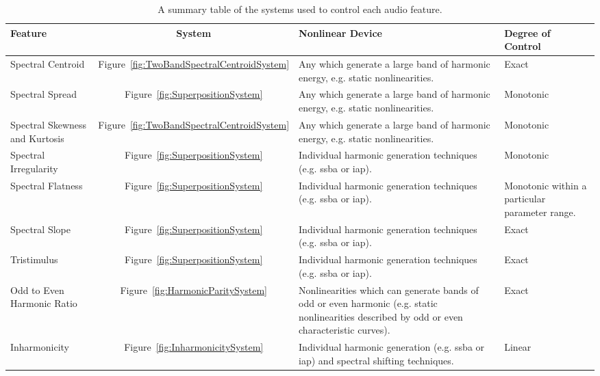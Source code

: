 	\begin{table}[h!]
		\centering
		\begin{tabular}{|C{3cm}|c|C{5cm}|C{3cm}|}
			\hline
			\bf{Feature} & \bf{System} & \bf{Nonlinear Device} & \bf{Degree of Control} \tabularnewline
			\hline
			\hline
			Spectral Centroid & Figure~\ref{fig:TwoBandSpectralCentroidSystem} & 
			Any which generate a large band of harmonic energy, e.g. static nonlinearities. & 
			Exact \tabularnewline
			\hline
			Spectral Spread & Figure~\ref{fig:SuperpositionSystem} & 
			Any which generate a large band of harmonic energy, e.g. static nonlinearities. & 
			Monotonic \tabularnewline
			\hline
			Spectral Skewness and Kurtosis & Figure~\ref{fig:TwoBandSpectralCentroidSystem} & 
			Any which generate a large band of harmonic energy, e.g. static nonlinearities. & 
			Monotonic \tabularnewline
			\hline
			Spectral Irregularity & Figure~\ref{fig:SuperpositionSystem} & 
			Individual harmonic generation techniques (e.g. \acrshort{ssba} or \acrshort{iap}). & 
			Monotonic \tabularnewline
			\hline
			Spectral Flatness & Figure~\ref{fig:SuperpositionSystem} &
			Individual harmonic generation techniques (e.g. \acrshort{ssba} or \acrshort{iap}). & 
			Monotonic within a particular parameter range. \tabularnewline
			\hline
			Spectral Slope & Figure~\ref{fig:SuperpositionSystem} &
			Individual harmonic generation techniques (e.g. \acrshort{ssba} or \acrshort{iap}). & 
			Exact \tabularnewline
			\hline
			Tristimulus & Figure~\ref{fig:SuperpositionSystem} & 
			Individual harmonic generation techniques (e.g. \acrshort{ssba} or \acrshort{iap}). & 
			Exact \tabularnewline			
			\hline
			Odd to Even Harmonic Ratio & Figure~\ref{fig:HarmonicParitySystem} &
			Nonlinearities which can generate bands of odd or even harmonic 
			(e.g. static nonlinearities described by odd or even characteristic curves). & 
			Exact \tabularnewline
			\hline
			Inharmonicity & Figure~\ref{fig:InharmonicitySystem} & 
			Individual harmonic generation (e.g. \acrshort{ssba} or \acrshort{iap}) and spectral shifting
			techniques. & 
			Linear \tabularnewline
			\hline
		\end{tabular}
		\caption{A summary table of the systems used to control each audio feature.}
		\label{tab:FeatureControlSummary}
	\end{table}
	
